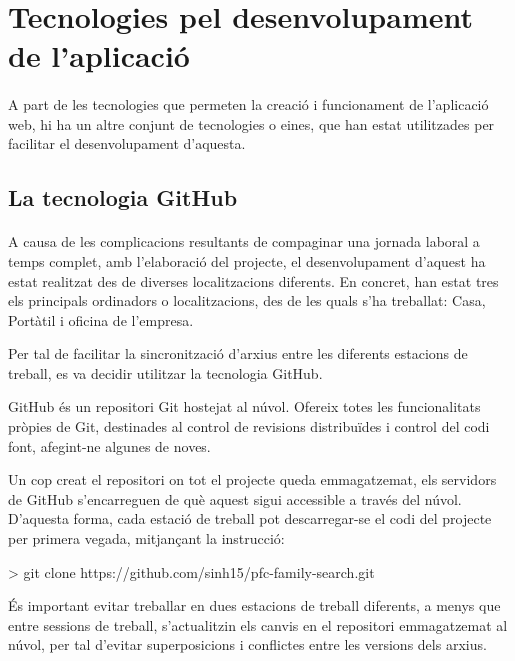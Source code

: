 \section{Tecnologies pel desenvolupament de l'aplicació}

    \paragraph{}
    A part de les tecnologies que permeten la creació i funcionament de l'aplicació web, hi ha un altre conjunt de tecnologies o eines, que han estat utilitzades per facilitar el desenvolupament d'aquesta.

    \subsection{La tecnologia GitHub}

    \paragraph{}
    A causa de les complicacions resultants de compaginar una jornada laboral a temps complet, amb l'elaboració del projecte, el desenvolupament d’aquest ha estat re\-a\-lit\-zat des de diverses localitzacions diferents. En concret, han estat tres els principals ordinadors o localitzacions, des de les quals s’ha treballat: Casa, Portàtil i oficina de l'empresa.

    Per tal de facilitar la sincronització d'arxius entre les diferents estacions de treball, es va decidir utilitzar la tecnologia GitHub.

    GitHub és un repositori Git hostejat al núvol. Ofereix totes les funcionalitats pròpies de Git, destinades al control de revisions distribuïdes i control del codi font, afegint-ne algunes de noves.

    Un cop creat el repositori on tot el projecte queda emmagatzemat, els servidors de GitHub s’encarreguen de què aquest sigui accessible a través del núvol. D’aquesta forma, cada estació de treball pot descarregar-se el codi del projecte per primera vegada, mitjançant la instrucció:

    \begin{displayquote}
        > git clone https://github.com/sinh15/pfc-family-search.git
    \end{displayquote}

    És important evitar treballar en dues estacions de treball diferents, a menys que entre sessions de treball, s’actualitzin els canvis en el repositori emmagatzemat al núvol, per tal d’evitar superposicions i conflictes entre les versions dels arxius.

